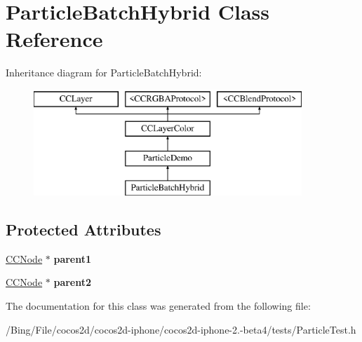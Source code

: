 \hypertarget{interface_particle_batch_hybrid}{\section{Particle\-Batch\-Hybrid Class Reference}
\label{interface_particle_batch_hybrid}
}
Inheritance diagram for Particle\-Batch\-Hybrid\-:\begin{figure}[H]
\begin{center}
\leavevmode
\includegraphics[height=4.000000cm]{interface_particle_batch_hybrid}
\end{center}
\end{figure}
\subsection*{Protected Attributes}
\begin{DoxyCompactItemize}
\item 
\hypertarget{interface_particle_batch_hybrid_a61bbe9c708971a8078a15ac3fe4db314}{\hyperlink{class_c_c_node}{C\-C\-Node} $\ast$ {\bfseries parent1}}\label{interface_particle_batch_hybrid_a61bbe9c708971a8078a15ac3fe4db314}

\item 
\hypertarget{interface_particle_batch_hybrid_ad6f684ca01eed7eac67115a80180088a}{\hyperlink{class_c_c_node}{C\-C\-Node} $\ast$ {\bfseries parent2}}\label{interface_particle_batch_hybrid_ad6f684ca01eed7eac67115a80180088a}

\end{DoxyCompactItemize}


The documentation for this class was generated from the following file\-:\begin{DoxyCompactItemize}
\item 
/\-Bing/\-File/cocos2d/cocos2d-\/iphone/cocos2d-\/iphone-\/2.-\/beta4/tests/Particle\-Test.\-h\end{DoxyCompactItemize}
